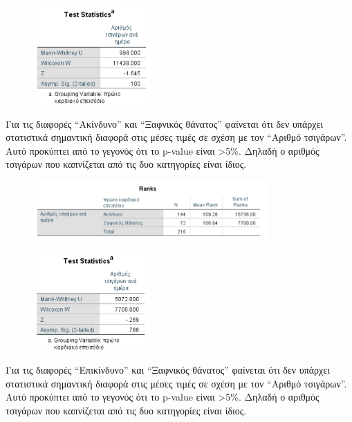 \clearpage

\begin{figure}[ht]
    \centering
    \includegraphics[width=0.4\textwidth]{images/211.PNG}
\end{figure}

Για τις διαφορές “Ακίνδυνο” και “Ξαφνικός θάνατος” φαίνεται ότι δεν υπάρχει στατιστικά σημαντική διαφορά στις μέσες τιμές σε σχέση με τον “Αριθμό τσιγάρων”. Αυτό προκύπτει από το γεγονός ότι το p-value είναι >5\%. Δηλαδή ο αριθμός τσιγάρων που καπνίζεται από τις δυο κατηγορίες είναι ίδιος.

\vspace{1cm}

\begin{figure}[h]
    \centering
    \includegraphics[width=0.8\textwidth]{images/212.PNG}
\end{figure}
\vspace{1cm}
\begin{figure}[h]
    \centering
    \includegraphics[width=0.4\textwidth]{images/213.PNG}
\end{figure}

\clearpage

\vspace{2cm}
Για τις διαφορές “Επικίνδυνο” και “Ξαφνικός θάνατος” φαίνεται ότι δεν υπάρχει στατιστικά σημαντική διαφορά στις μέσες τιμές σε σχέση με τον “Αριθμό τσιγάρων”. Αυτό προκύπτει από το γεγονός ότι το p-value είναι >5\%. Δηλαδή ο αριθμός τσιγάρων που καπνίζεται από τις δυο κατηγορίες είναι ίδιος.

